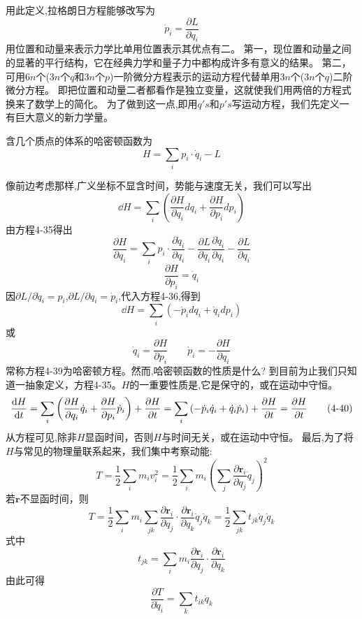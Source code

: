 用此定义,拉格朗日方程能够改写为
\[\dot{p}_i=\frac{\partial L}{\partial q_i} \tag{4-34}\]
用位置和动量来表示力学比单用位置表示其优点有二。
第一，现位置和动量之间的显著的平行结构，它在经典力学和量子力中都构成许多有意义的结果。
第二，可用$6n$个($3n$个$q$和$3n$个$p$)一阶微分方程表示的运动方程代替单用$3n$个($3n$个$q$)二阶微分方程。
即把位置和动量二者都看作是独立变量，这就使我们用两倍的方程式换来了数学上的简化。
为了做到这一点,即用$q's$和$p's$写运动方程，我们先定义一有巨大意义的新力学量。

\begin{definition}[哈密顿函数]
    含几个质点的体系的哈密顿函数为
    \[H=\sum_i p_i \cdot \dot{q}_i-L \tag{4-35}\]
\end{definition}

像前边考虑那样,广义坐标不显含时间，势能与速度无关，我们可以写出
\[\dd{H}=\sum_i\left(\frac{\partial H}{\partial q_i}dq_i+\frac{\partial H}{\partial p_i}dp_i\right) \tag{4-36}\]
由方程4-35得出
\[\frac{\partial H}{\partial q_i}=\sum_ip_i \cdot \frac{\partial \dot{q}_i}{\partial q_i}-\frac{\partial L}{\partial \dot{q}_i}\frac{\partial \dot{q}_i}{\partial q_i}-\frac{\partial L}{\partial q_i} \tag{4-37a}\]
\[\frac{\partial H}{\partial p_i}=\dot{q}_i \tag{4-37b}\]
因$\partial L/\partial \dot{q}_i=p_i$,$\partial L/\partial q_i=\dot{p}_i$,代入方程4-36,得到
\[\dd{H}=\sum_i\left(-\dot{p}_idq_i+\dot{q}_idp_i\right) \tag{4-38}\]
或
\[\dot{q}_i=\frac{\partial H}{\partial p_i} \qquad \dot{p}_i=-\frac{\partial H}{\partial q_i} \tag{4-39}\]
常称方程4-39为哈密顿方程。然而,哈密顿函数的性质是什么?
到目前为止我们只知道一抽象定义，方程4-35。$H$的一重要性质是,它是保守的，或在运动中守恒。
\[\dv{H}{t}=\sum_i\left(\frac{\partial H}{\partial q_i}\dot{q}_i+\frac{\partial H}{\partial p_i}\dot{p}_i\right)+\frac{\partial H}{\partial t}=\sum_i\left(-\dot{p}_i\dot{q}_i+\dot{q}_i\dot{p}_i\right)+\frac{\partial H}{\partial t}=\frac{\partial H}{\partial t} \tag{4-40}\]
从方程可见,除非$H$显函时间，否则$H$与时间无关，或在运动中守恒。
最后,为了将$H$与常见的物理量联系起来，我们集中考察动能:
\[T=\frac{1}{2}\sum_im_iv_i^2=\frac{1}{2}\sum_im_i\left(\sum_j\frac{\partial \mathbf{r}_i}{\partial q_j}\dot{q}_j\right)^2 \tag{4-41}\]
若$\mathbf{r}$不显函时间，则
\[T=\frac{1}{2}\sum_im_i\sum_{jk}\frac{\partial \mathbf{r}_i}{\partial q_j} \cdot \frac{\partial \mathbf{r}_i}{\partial q_k}\dot{q}_j\dot{q}_k=\frac{1}{2}\sum_{jk}t_{jk}\dot{q}_j\dot{q}_k \tag{4-42}\]
式中
\[t_{jk}=\sum_im_i\frac{\partial \mathbf{r}_i}{\partial q_j} \cdot \frac{\partial \mathbf{r}_i}{\partial q_k} \tag{4-43}\]
由此可得
\[\frac{\partial T}{\partial \dot{q}_i}=\sum_kt_{ik}\dot{q}_k \tag{4-44}\]
